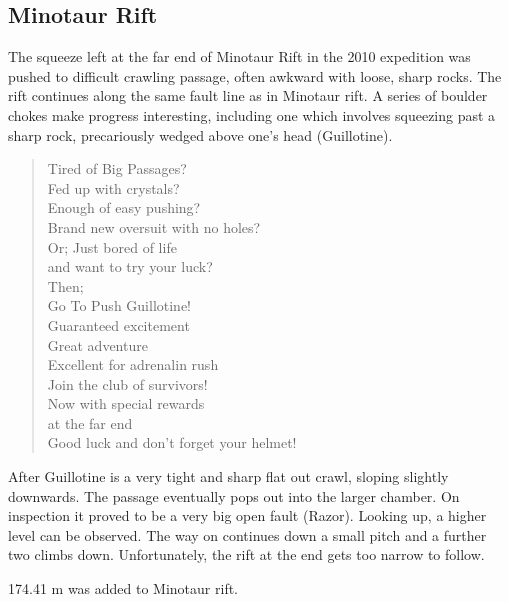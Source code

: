 \hypertarget{minotaur-rift}{%
\subsection{Minotaur Rift}\label{minotaur-rift}}

The squeeze left at the far end of Minotaur Rift in the 2010 expedition
was pushed to difficult crawling passage, often awkward with loose,
sharp rocks. The rift continues along the same fault line as in Minotaur
rift. A series of boulder chokes make progress interesting, including
one which involves squeezing past a sharp rock, precariously wedged
above one's head (Guillotine).

\begin{verse}
Tired of Big Passages? \\
Fed up with crystals? \\
Enough of easy pushing? \\
Brand new oversuit with no holes? \\

Or; Just bored of life \\
   and want to try your luck? \\

Then; \\ 

Go To Push Guillotine! \\

Guaranteed excitement \\
Great adventure \\
Excellent for adrenalin rush \\

Join the club of survivors! \\

Now with special rewards \\
at the far end \\

Good luck and don't forget your helmet!
\end{verse}

After Guillotine is a very tight and sharp flat out crawl, sloping
slightly downwards. The passage eventually pops out into the larger
chamber. On inspection it proved to be a very big open fault (Razor).
Looking up, a higher level can be observed. The way on continues down a
small pitch and a further two climbs down. Unfortunately, the rift at
the end gets too narrow to follow.

174.41 m was added to Minotaur rift.

